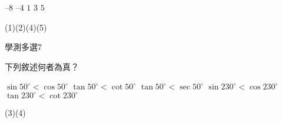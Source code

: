 \begin{QUESTIONS}
\begin{QUESTION}
\begin{QBODY}
\begin{QOPS}
                \QOP $–8 $
                \QOP $–4$
                \QOP $1	$
                \QOP $3$
                \QOP $5$
            \end{QOPS}            
        \end{QBODY}
        \begin{QFROMS}
        \end{QFROMS}
        \begin{QTAGS}\end{QTAGS}
        \begin{QANS}
            (1)(2)(4)(5)
        \end{QANS}
        \begin{QSOLLIST}
        \end{QSOLLIST}
        \begin{QEMPTYSPACE}
        \end{QEMPTYSPACE}
    \end{QUESTION}
    \begin{QUESTION}
        \begin{ExamInfo}{87}{學測}{多選}{7}
        \end{ExamInfo}
        \begin{ExamAnsRateInfo}{}{}{}{}
        \end{ExamAnsRateInfo}
        \begin{QBODY}
            下列敘述何者為真？
            \begin{QOPS}
                \QOP $\sin {{50}^{\circ }}<\cos {{50}^{\circ }}$	
                \QOP $\tan {{50}^{\circ }}<\cot {{50}^{\circ }}$
                \QOP $\tan {{50}^{\circ }}<\sec {{50}^{\circ }}$	
                \QOP $\sin {{230}^{\circ }}<\cos {{230}^{\circ }}$	
                \QOP $\tan {{230}^{\circ }}<\cot {{230}^{\circ }}$
            \end{QOPS}
        \end{QBODY}
        \begin{QFROMS}
        \end{QFROMS}
        \begin{QTAGS}\end{QTAGS}
        \begin{QANS}
            (3)(4)
        \end{QANS}
        \begin{QSOLLIST}
        \end{QSOLLIST}
        \begin{QEMPTYSPACE}
        \end{QEMPTYSPACE}
    \end{QUESTION}

\end{QUESTIONS}
